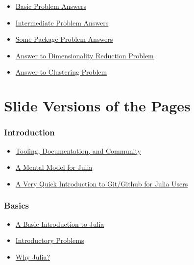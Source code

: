 \documentclass[11pt]{article}
\begin{document}
\begin{itemize}
\itemsep1pt\parskip0pt
\item
  \href{http://ucidatascienceinitiative.github.io/IntroToJulia/Html/BasicProblemAnswers}{Basic
  Problem Answers}
\item
  \href{http://ucidatascienceinitiative.github.io/IntroToJulia/Html/IntermediateProblemAnswers}{Intermediate
  Problem Answers}
\item
  \href{http://ucidatascienceinitiative.github.io/IntroToJulia/Html/PackageProblemAnswers}{Some
  Package Problem Answers}
\item
  \href{http://ucidatascienceinitiative.github.io/IntroToJulia/Html/DimensionalityReductionSolutions}{Answer
  to Dimensionality Reduction Problem}
\item
  \href{http://ucidatascienceinitiative.github.io/IntroToJulia/Html/ClusteringSolutions}{Answer
  to Clustering Problem}
\end{itemize}

    \section{Slide Versions of the Pages}\label{slide-versions-of-the-pages}

\subsubsection{Introduction}\label{introduction}

\begin{itemize}
\itemsep1pt\parskip0pt
\item
  \href{http://ucidatascienceinitiative.github.io/IntroToJulia/Slides/ToolingDocumentationCommunity}{Tooling,
  Documentation, and Community}
\item
  \href{http://ucidatascienceinitiative.github.io/IntroToJulia/Slides/JuliaMentalModel}{A
  Mental Model for Julia}
\item
  \href{http://ucidatascienceinitiative.github.io/IntroToJulia/Slides/GithubIntroduction}{A
  Very Quick Introduction to Git/Github for Julia Users}
\end{itemize}

\subsubsection{Basics}\label{basics}

\begin{itemize}
\itemsep1pt\parskip0pt
\item
  \href{http://ucidatascienceinitiative.github.io/IntroToJulia/Slides/BasicIntroduction}{A
  Basic Introduction to Julia}
\item
  \href{http://ucidatascienceinitiative.github.io/IntroToJulia/Slides/BasicProblems}{Introductory
  Problems}
\item
  \href{http://ucidatascienceinitiative.github.io/IntroToJulia/Slides/WhyJulia}{Why
  Julia?}
\end{itemize}
\end{document}
